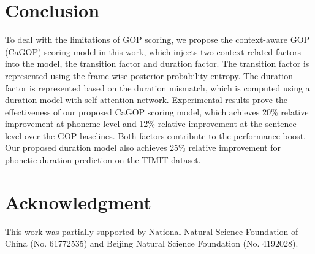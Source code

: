 \documentclass[a4paper]{article}
\begin{document}
\section{Conclusion}
To deal with the limitations of GOP scoring, we propose the context-aware GOP (CaGOP) scoring model in this work, which injects two context related factors into the model, the transition factor and duration factor. The transition factor is represented using the frame-wise posterior-probability entropy. The duration factor is represented based on the duration mismatch, which is computed using a duration model with self-attention network. Experimental results prove the effectiveness of our proposed CaGOP scoring model, which achieves 20\% relative improvement at phoneme-level and 12\% relative improvement at the sentence-level over the GOP baselines. 
Both factors contribute to the performance boost. 
Our proposed duration model also achieves 25\% relative improvement for phonetic duration prediction on the TIMIT dataset.

\section{Acknowledgment}
This work was partially supported by National Natural Science Foundation of China (No. 61772535) and Beijing Natural Science Foundation (No. 4192028).




\end{document}
